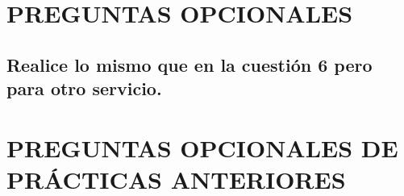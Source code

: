 \section{PREGUNTAS OPCIONALES}
	\subsection{Realice lo mismo que en la cuestión 6 pero para otro servicio.}

\section{PREGUNTAS OPCIONALES DE PRÁCTICAS ANTERIORES}






